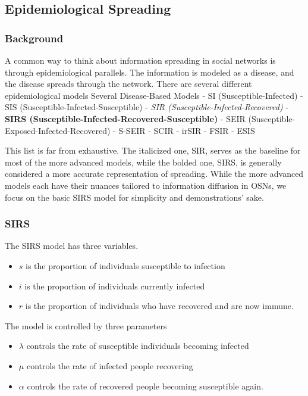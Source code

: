 \documentclass[11pt]{article}
\providecommand{\tightlist}{%
      \setlength{\itemsep}{0pt}\setlength{\parskip}{0pt}}
\begin{document}
    \hypertarget{epidemiological-spreading}{%
\subsection{Epidemiological Spreading}\label{epidemiological-spreading}}

    \hypertarget{background}{%
\subsubsection{Background}\label{background}}

A common way to think about information spreading in social networks is
through epidemiological parallels. The information is modeled as a
disease, and the disease spreads through the network. There are several
different epidemiological models Several Disease-Based Models - SI
(Susceptible-Infected) - SIS (Susceptible-Infected-Susceptible) -
\emph{SIR (Susceptible-Infected-Recovered)} - \textbf{SIRS
(Susceptible-Infected-Recovered-Susceptible)} - SEIR
(Susceptible-Exposed-Infected-Recovered) - S-SEIR - SCIR - irSIR - FSIR
- ESIS

This list is far from exhaustive. The italicized one, SIR, serves as the
baseline for most of the more advanced models, while the bolded one,
SIRS, is generally considered a more accurate representation of
spreading. While the more advanced models each have their nuances
tailored to information diffusion in OSNs, we focus on the basic SIRS
model for simplicity and demonstrations' sake.

    \hypertarget{sirs}{%
\subsubsection{SIRS}\label{sirs}}

The SIRS model has three variables.

\begin{itemize}
\tightlist
\item
  \(s\) is the proportion of individuals susceptible to infection
\item
  \(i\) is the proportion of individuals currently infected
\item
  \(r\) is the proportion of individuals who have recovered and are now
  immune.
\end{itemize}

The model is controlled by three parameters

\begin{itemize}
\tightlist
\item
  \(\lambda\) controls the rate of susceptible individuals becoming
  infected
\item
  \(\mu\) controls the rate of infected people recovering
\item
  \(\alpha\) controls the rate of recovered people becoming susceptible
  again.
\end{itemize}
\end{document}
